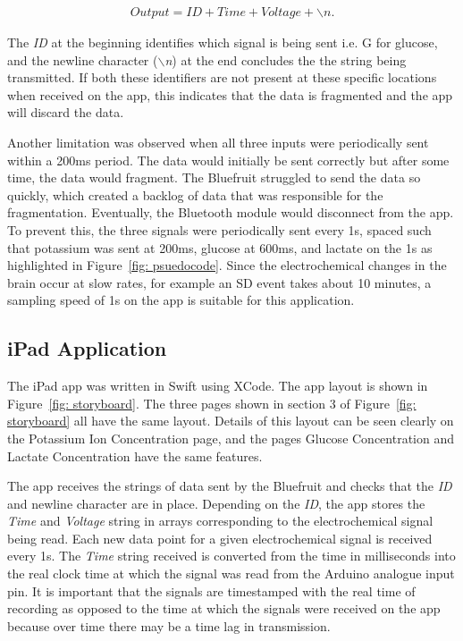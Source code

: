 \begin{align}
    Output = ID + Time + Voltage + \backslash n.
    \nonumber
\end{align}

The \textit{ID} at the beginning identifies which signal is being sent i.e. G for glucose, and the newline character (\textit{$\backslash$n}) at the end concludes the the string being transmitted. If both these identifiers are not present at these specific locations when received on the app, this indicates that the data is fragmented and the app will discard the data. 

Another limitation was observed when all three inputs were periodically sent within a 200ms period. The data would initially be sent correctly but after some time, the data would fragment. The Bluefruit struggled to send the data so quickly, which created a backlog of data that was responsible for the fragmentation. Eventually, the Bluetooth module would disconnect from the app. To prevent this, the three signals were periodically sent every 1s, spaced such that potassium was sent at 200ms, glucose at 600ms, and lactate on the 1s as highlighted in Figure~\ref{fig: psuedocode}. Since the electrochemical changes in the brain occur at slow rates, for example an SD event takes about 10 minutes, a sampling speed of 1s on the app is suitable for this application. 





\subsection{iPad Application}
The iPad app was written in Swift using XCode. The app layout is shown in Figure~\ref{fig: storyboard}. The three pages shown in section 3 of Figure~\ref{fig: storyboard} all have the same layout. Details of this layout can be seen clearly on the Potassium Ion Concentration page, and the pages Glucose Concentration and Lactate Concentration have the same features. 

The app receives the strings of data sent by the Bluefruit and checks that the \textit{ID} and newline character are in place. Depending on the \textit{ID}, the app stores the \textit{Time} and \textit{Voltage} string in arrays corresponding to the electrochemical signal being read. Each new data point for a given electrochemical signal is received every 1s. The \textit{Time} string received is converted from the time in milliseconds into the real clock time at which the signal was read from the Arduino analogue input pin. It is important that the signals are timestamped with the real time of recording as opposed to the time at which the signals were received on the app because over time there may be a time lag in transmission.

